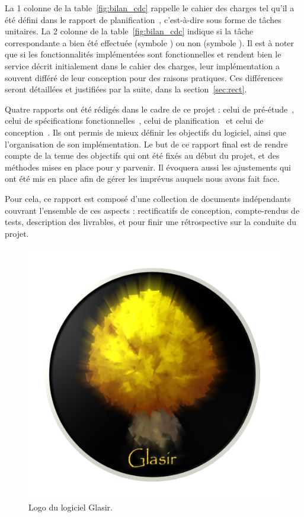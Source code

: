     La 1\iere{} colonne de la {\sc table}~\ref{fig:bilan_cdc} rappelle le cahier des charges tel qu'il a été défini dans le rapport de planification~\cite{planif}, c'est-à-dire sous forme de tâches unitaires. La 2\ieme{} colonne de la {\sc table}~\ref{fig:bilan_cdc} indique si la tâche correspondante a bien été effectuée (symbole \textcolor{bo_vert}{}) ou non (symbole \textcolor{nouvo_rouge}{}). Il est à noter que si les fonctionnalités implémentées sont fonctionnelles et rendent bien le service décrit initialement dans le cahier des charges, leur implémentation a souvent différé de leur conception pour des raisons pratiques. Ces différences seront détaillées et justifiées par la suite, dans la {\sc section}~\ref{sec:rect}.

    Quatre rapports ont été rédigés dans le cadre de ce projet : celui de pré-étude~\cite{pre_etude}, celui de spécifications fonctionnelles~\cite{spec_fonc}, celui de planification~\cite{planif} et celui de conception~\cite{conception}. Ils ont permis de mieux définir les objectifs du logiciel, ainsi que l'organisation de son implémentation. Le but de ce rapport final est de rendre compte de la tenue des objectifs qui ont été fixés au début du projet, et des méthodes mises en place pour y parvenir. Il évoquera aussi les ajustements qui ont été mis en place afin de gérer les imprévus auquels nous avons fait face. 

    Pour cela, ce rapport est composé d'une collection de documents indépendants couvrant l'ensemble de ces aspects : rectificatifs de conception, compte-rendus de tests, description des livrables, et pour finir une rétrospective sur la conduite du projet.

    \vspace{4mm}

    \begin{figure}[!h]
        \centering
        \includegraphics[height=0.5\textwidth]{figure/glasir.png}
        \caption{Logo du logiciel Glasir.}
        \label{fig:glasir}
    \end{figure}